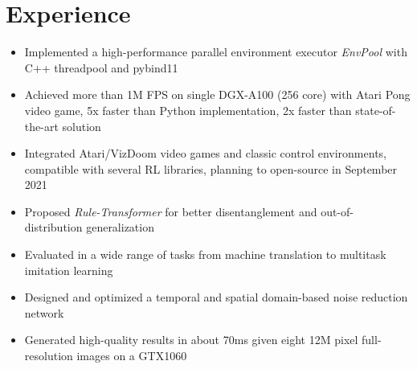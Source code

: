 \documentclass{resume}
\begin{document}
\section{Experience}
\begin{itemize}
\item Implemented a high-performance parallel environment executor \textit{EnvPool} with C++ threadpool and pybind11
\item Achieved more than 1M FPS on single DGX-A100 (256 core) with Atari Pong video game, 5x faster than Python implementation, 2x faster than state-of-the-art solution
\item Integrated Atari/VizDoom video games and classic control environments, compatible with several RL libraries, planning to open-source in September 2021
\end{itemize}


\begin{itemize}
    \item Proposed \textit{Rule-Transformer} for better disentanglement and out-of-distribution generalization
    \item Evaluated in a wide range of tasks from machine translation to multitask imitation learning
\end{itemize}

\begin{itemize}
    \item Designed and optimized a temporal and spatial domain-based noise reduction network
    \item Generated high-quality results in about 70ms given eight 12M pixel full-resolution images on a GTX1060
\end{itemize}
\end{document}
